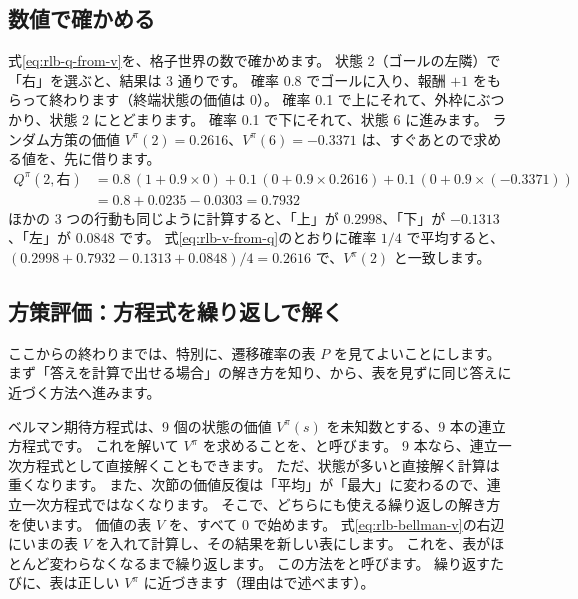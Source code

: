 \subsection*{数値で確かめる}

式\eqref{eq:rlb-q-from-v}を、格子世界の数で確かめます。
状態 2（ゴールの左隣）で「右」を選ぶと、結果は 3 通りです。
確率 0.8 でゴールに入り、報酬 $+1$ をもらって終わります（終端状態の価値は 0）。
確率 0.1 で上にそれて、外枠にぶつかり、状態 2 にとどまります。
確率 0.1 で下にそれて、状態 6 に進みます。
ランダム方策の価値 $V^\pi(2)=0.2616$、$V^\pi(6)=-0.3371$ は、すぐあとので求める値を、先に借ります。
\begin{align*}
Q^\pi(2,\text{右})
&=0.8\,(1+0.9\times0)+0.1\,(0+0.9\times0.2616)+0.1\,(0+0.9\times(-0.3371))\\
&=0.8+0.0235-0.0303=0.7932
\end{align*}
ほかの 3 つの行動も同じように計算すると、「上」が $0.2998$、「下」が $-0.1313$、「左」が $0.0848$ です。
式\eqref{eq:rlb-v-from-q}のとおりに確率 $1/4$ で平均すると、$(0.2998+0.7932-0.1313+0.0848)/4=0.2616$ で、$V^\pi(2)$ と一致します。

\subsection*{方策評価：方程式を繰り返しで解く}

ここからの終わりまでは、特別に、遷移確率の表 $P$ を見てよいことにします。
まず「答えを計算で出せる場合」の解き方を知り、から、表を見ずに同じ答えに近づく方法へ進みます。

ベルマン期待方程式は、9 個の状態の価値 $V^\pi(s)$ を未知数とする、9 本の連立方程式です。
これを解いて $V^\pi$ を求めることを、と呼びます。
9 本なら、連立一次方程式として直接解くこともできます。
ただ、状態が多いと直接解く計算は重くなります。
また、次節の価値反復は「平均」が「最大」に変わるので、連立一次方程式ではなくなります。
そこで、どちらにも使える繰り返しの解き方を使います。
価値の表 $V$ を、すべて 0 で始めます。
式\eqref{eq:rlb-bellman-v}の右辺にいまの表 $V$ を入れて計算し、その結果を新しい表にします。
これを、表がほとんど変わらなくなるまで繰り返します。
この方法をと呼びます。
繰り返すたびに、表は正しい $V^\pi$ に近づきます（理由はで述べます）。



